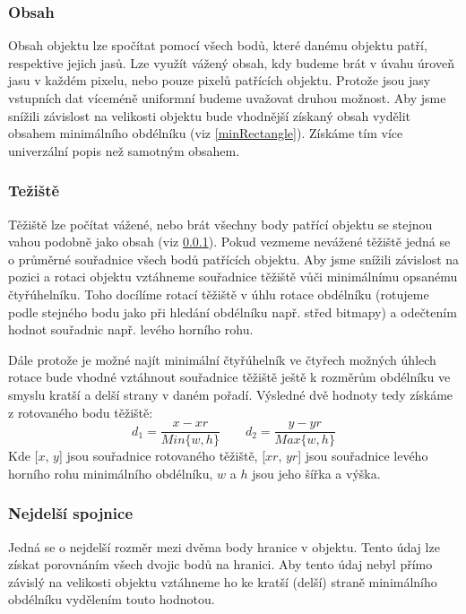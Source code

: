\documentclass[12pt]{article}
\begin{document}
\subsubsection{Obsah}
\label{volume}
Obsah objektu lze spočítat pomocí všech bodů, které danému objektu patří, respektive jejich jasů. Lze využít vážený obsah, kdy budeme brát v úvahu úroveň jasu v každém pixelu, nebo pouze pixelů patřících objektu. Protože jsou jasy vstupních dat víceméně uniformní budeme uvažovat druhou možnost. Aby jsme snížili závislost na velikosti objektu bude vhodnější získaný obsah vydělit obsahem minimálního obdélníku (viz \ref{minRectangle}). Získáme tím více univerzální popis než samotným obsahem.

\subsubsection{Težiště}
Těžiště lze počítat vážené, nebo brát všechny body patřící objektu se stejnou vahou podobně jako obsah (viz \ref{volume}). Pokud vezmeme nevážené těžiště jedná se o průměrné souřadnice všech bodů patřících objektu. Aby jsme snížili závislost na pozici a rotaci objektu vztáhneme souřadnice těžiště vůči minimálnímu opsanému čtyřúhelníku. Toho docílíme rotací těžiště v úhlu rotace obdélníku (rotujeme podle stejného bodu jako při hledání obdélníku např. střed bitmapy) a odečtením hodnot souřadnic např. levého horního rohu. 

Dále protože je možné najít minimální čtyřúhelník ve čtyřech možných úhlech rotace bude vhodné vztáhnout souřadnice těžiště ještě k rozměrům obdélníku ve smyslu kratší a delší strany v daném pořadí. Výsledné dvě hodnoty tedy získáme z rotovaného bodu těžiště:
\begin{equation} \label{eq1}
d_1 = \frac{x - xr}{Min\{w, h\}} \qquad
d_2 = \frac{y - yr}{Max\{w, h\}}
\end{equation}
Kde [$x$, $y$] jsou souřadnice rotovaného těžiště, [$xr$, $yr$] jsou souřadnice levého horního rohu minimálního obdélníku, $w$ a $h$ jsou jeho šířka a výška.

\pagebreak
\subsubsection{Nejdelší spojnice}
\label{longLine}
Jedná se o nejdelší rozměr mezi dvěma body hranice v objektu. Tento údaj lze získat porovnáním všech dvojic bodů na hranici. Aby tento údaj nebyl přímo závislý na velikosti objektu vztáhneme ho ke kratší (delší) straně minimálního obdélníku vydělením touto hodnotou.
\end{document}

